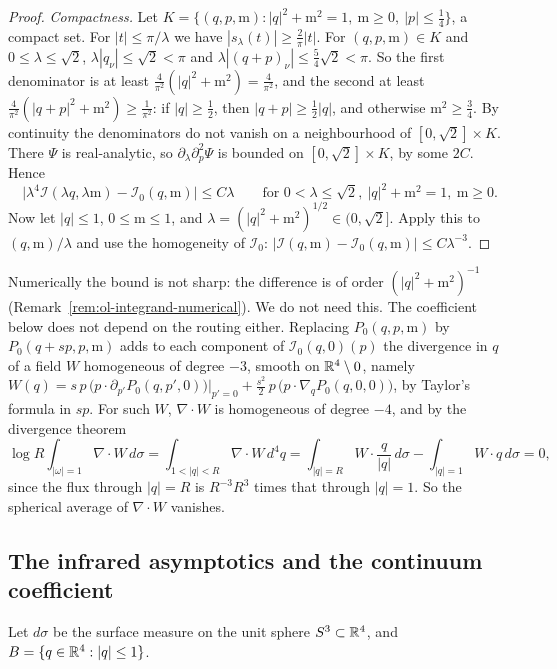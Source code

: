 \begin{proof}
\emph{Compactness.} Let $K=\{(q,p,\mathrm m):|q|^2+\mathrm m^2=1,\ \mathrm m\ge0,\ |p|\le\frac14\}$, a compact set. For $|t|\le\pi/\lambda$ we have $|s_\lambda(t)|\ge\frac2\pi|t|$. For $(q,p,\mathrm m)\in K$ and $0\le\lambda\le\sqrt2$, $\lambda|q_\nu|\le\sqrt2<\pi$ and $\lambda|(q+p)_\nu|\le\frac54\sqrt2<\pi$. So the first denominator is at least $\frac4{\pi^2}(|q|^2+\mathrm m^2)=\frac4{\pi^2}$, and the second at least $\frac4{\pi^2}(|q+p|^2+\mathrm m^2)\ge\frac1{\pi^2}$: if $|q|\ge\frac12$, then $|q+p|\ge\frac12|q|$, and otherwise $\mathrm m^2\ge\frac34$. By continuity the denominators do not vanish on a neighbourhood of $[0,\sqrt2]\times K$. There $\Psi$ is real-analytic, so $\partial_\lambda\partial_p^2\Psi$ is bounded on $[0,\sqrt2]\times K$, by some $2C$. Hence
\[
\big|\lambda^4\mathcal I(\lambda q,\lambda\mathrm m)-\mathcal I_0(q,\mathrm m)\big|\le C\lambda\qquad\text{for }0<\lambda\le\sqrt2,\ |q|^2+\mathrm m^2=1,\ \mathrm m\ge0 .
\]
Now let $|q|\le1$, $0\le\mathrm m\le1$, and $\lambda=(|q|^2+\mathrm m^2)^{1/2}\in(0,\sqrt2]$. Apply this to $(q,\mathrm m)/\lambda$ and use the homogeneity of $\mathcal I_0$: $|\mathcal I(q,\mathrm m)-\mathcal I_0(q,\mathrm m)|\le C\lambda^{-3}$.
\end{proof}

Numerically the bound is not sharp: the difference is of order $(|q|^2+\mathrm m^2)^{-1}$ (Remark~\ref{rem:ol-integrand-numerical}). We do not need this. The coefficient below does not depend on the routing either. Replacing $P_0(q,p,\mathrm m)$ by $P_0(q+sp,p,\mathrm m)$ adds to each component of $\mathcal I_0(q,0)(p)$ the divergence in $q$ of a field $W$ homogeneous of degree $-3$, smooth on $\mathbb R^4\setminus0$, namely $W(q)=s\,p\,\big(p\cdot\partial_{p'}P_0(q,p',0)\big)|_{p'=0}+\frac{s^2}2\,p\,\big(p\cdot\nabla_qP_0(q,0,0)\big)$, by Taylor's formula in $sp$. For such $W$, $\nabla\cdot W$ is homogeneous of degree $-4$, and by the divergence theorem
\[
\log R\int_{|\omega|=1}\nabla\cdot W\,d\sigma=\int_{1<|q|<R}\nabla\cdot W\,d^4q=\int_{|q|=R}W\cdot\frac q{|q|}\,d\sigma-\int_{|q|=1}W\cdot q\,d\sigma=0,
\]
since the flux through $|q|=R$ is $R^{-3}R^3$ times that through $|q|=1$. So the spherical average of $\nabla\cdot W$ vanishes.

\subsection{The infrared asymptotics and the continuum coefficient}\label{ss:57.5}

Let $d\sigma$ be the surface measure on the unit sphere $S^3\subset\mathbb R^4$, and $B=\{q\in\mathbb R^4:|q|\le1\}$.


